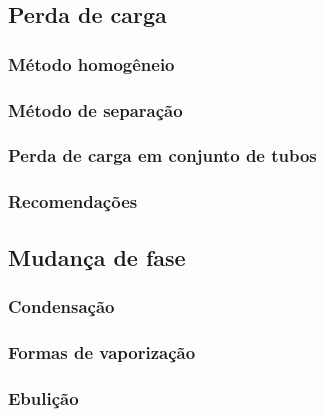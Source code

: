 \subsection{Perda de carga}
\subsubsection{Método homogêneio}
\subsubsection{Método de separação}
\subsubsection{Perda de carga em conjunto de tubos}
\subsubsection{Recomendações}

\subsection{Mudança de fase}
\subsubsection{Condensação}
\subsubsection{Formas de vaporização}
\subsubsection{Ebulição}



